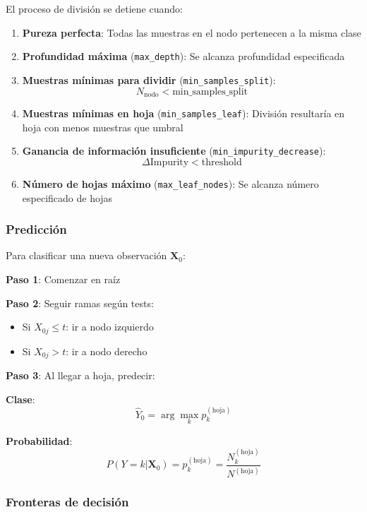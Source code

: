\documentclass[
  doc,
  floatsintext,
  longtable,
  a4paper,
  nolmodern,
  notxfonts,
  notimes,
  12pt,
  colorlinks=true,linkcolor=blue,citecolor=blue,urlcolor=blue]{apa7}
\providecommand{\tightlist}{%
  \setlength{\itemsep}{0pt}\setlength{\parskip}{0pt}}
\begin{document}
El proceso de división se detiene cuando:

\begin{enumerate}
\def\labelenumi{\arabic{enumi}.}
\item
  \textbf{Pureza perfecta}: Todas las muestras en el nodo pertenecen a
  la misma clase
\item
  \textbf{Profundidad máxima} (\texttt{max\_depth}): Se alcanza
  profundidad especificada
\item
  \textbf{Muestras mínimas para dividir} (\texttt{min\_samples\_split}):
  \[
  N_{\text{nodo}} < \text{min\_samples\_split}
  \]
\item
  \textbf{Muestras mínimas en hoja} (\texttt{min\_samples\_leaf}):
  División resultaría en hoja con menos muestras que umbral
\item
  \textbf{Ganancia de información insuficiente}
  (\texttt{min\_impurity\_decrease}): \[
  \Delta \text{Impurity} < \text{threshold}
  \]
\item
  \textbf{Número de hojas máximo} (\texttt{max\_leaf\_nodes}): Se
  alcanza número especificado de hojas
\end{enumerate}

\subsubsection{Predicción}\label{predicciuxf3n}

Para clasificar una nueva observación \(\mathbf{X}_0\):

\textbf{Paso 1}: Comenzar en raíz

\textbf{Paso 2}: Seguir ramas según tests:

\begin{itemize}
\tightlist
\item
  Si \(X_{0j} \leq t\): ir a nodo izquierdo
\item
  Si \(X_{0j} > t\): ir a nodo derecho
\end{itemize}

\textbf{Paso 3}: Al llegar a hoja, predecir:

\textbf{Clase}: \[
\hat{Y}_0 = \arg\max_k p_k^{(\text{hoja})}
\]

\textbf{Probabilidad}: \[
P(Y=k|\mathbf{X}_0) = p_k^{(\text{hoja})} = \frac{N_k^{(\text{hoja})}}{N^{(\text{hoja})}}
\]

\subsubsection{Fronteras de decisión}\label{fronteras-de-decisiuxf3n-1}
\end{document}
